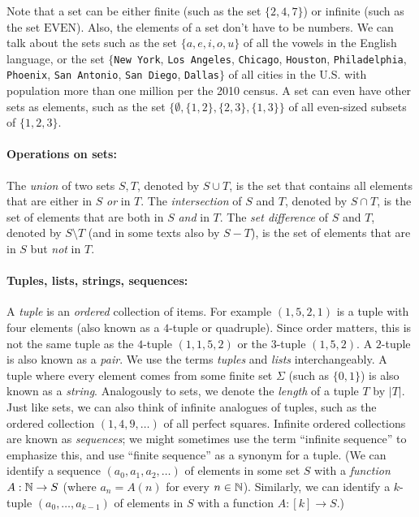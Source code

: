 Note that a set can be either finite (such as the set \(\{2,4,7\}\)) or
infinite (such as the set \(\text{EVEN}\)). Also, the elements of a set
don't have to be numbers. We can talk about the sets such as the set
\(\{a,e,i,o,u \}\) of all the vowels in the English language, or the set
\(\{\)\texttt{New York}, \texttt{Los Angeles}, \texttt{Chicago},
\texttt{Houston}, \texttt{Philadelphia}, \texttt{Phoenix},
\texttt{San Antonio}, \texttt{San Diego}, \texttt{Dallas}\(\}\) of all
cities in the U.S. with population more than one million per the 2010
census. A set can even have other sets as elements, such as the set
\(\{ \emptyset, \{1,2\},\{2,3\},\{1,3\} \}\) of all even-sized subsets
of \(\{1,2,3\}\).

\paragraph{Operations on sets:} The \emph{union} of two sets \(S,T\),
denoted by \(S \cup T\), is the set that contains all elements that are
either in \(S\) \emph{or} in \(T\). The \emph{intersection} of \(S\) and
\(T\), denoted by \(S \cap T\), is the set of elements that are both in
\(S\) \emph{and} in \(T\). The \emph{set difference} of \(S\) and \(T\),
denoted by \(S \setminus T\) (and in some texts also by \(S-T\)), is the
set of elements that are in \(S\) but \emph{not} in \(T\).

\paragraph{Tuples, lists, strings, sequences:} A \emph{tuple} is an
\emph{ordered} collection of items. For example \((1,5,2,1)\) is a tuple
with four elements (also known as a \(4\)-tuple or quadruple). Since
order matters, this is not the same tuple as the \(4\)-tuple
\((1,1,5,2)\) or the \(3\)-tuple \((1,5,2)\). A \(2\)-tuple is also
known as a \emph{pair}. We use the terms \emph{tuples} and \emph{lists}
interchangeably. A tuple where every element comes from some finite set
\(\Sigma\) (such as \(\{0,1\}\)) is also known as a \emph{string}.
Analogously to sets, we denote the \emph{length} of a tuple \(T\) by
\(|T|\). Just like sets, we can also think of infinite analogues of
tuples, such as the ordered collection \((1,4,9,\ldots )\) of all
perfect squares. Infinite ordered collections are known as
\emph{sequences}; we might sometimes use the term ``infinite sequence''
to emphasize this, and use ``finite sequence'' as a synonym for a tuple.
(We can identify a sequence \((a_0,a_1,a_2,\ldots)\) of elements in some
set \(S\) with a \emph{function} \(A:{\mathbb{N}} \rightarrow S\) (where
\(a_n = A(n)\) for every \(n\in {\mathbb{N}}\)). Similarly, we can identify a
\(k\)-tuple \((a_0,\ldots,a_{k-1})\) of elements in \(S\) with a
function \(A:[k] \rightarrow S\).)

